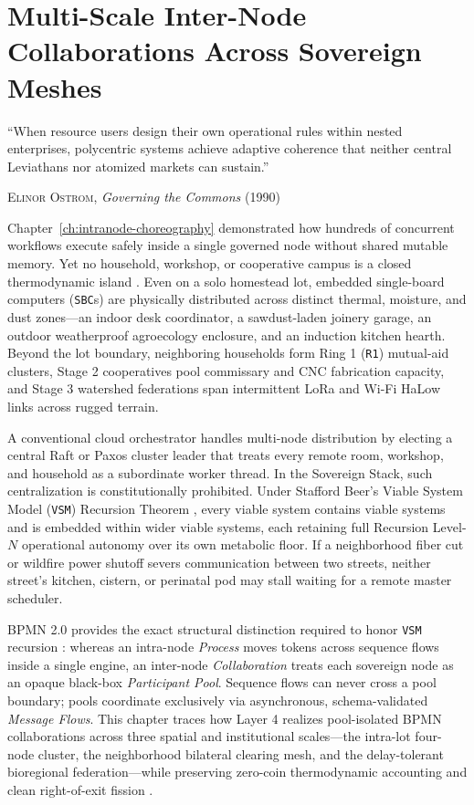\chapter{Multi-Scale Inter-Node Collaborations Across Sovereign Meshes}
\label{ch:internode-mesh}

\epigraph{``When resource users design their own operational rules within nested enterprises, polycentric systems achieve adaptive coherence that neither central Leviathans nor atomized markets can sustain.''}{\textsc{Elinor Ostrom}, \textit{Governing the Commons} (1990)}

Chapter~\ref{ch:intranode-choreography} demonstrated how hundreds of concurrent workflows
execute safely inside a single governed node without shared mutable memory. Yet no household,
workshop, or cooperative campus is a closed thermodynamic island \parencite{odum1971}. Even on
a solo homestead lot, embedded single-board computers (\texttt{SBC}s) are physically
distributed across distinct thermal, moisture, and dust zones---an indoor desk coordinator, a
sawdust-laden joinery garage, an outdoor weatherproof agroecology enclosure, and an induction
kitchen hearth. Beyond the lot boundary, neighboring households form Ring 1 (\texttt{R1})
mutual-aid clusters, Stage 2 cooperatives pool commissary and CNC fabrication capacity, and
Stage 3 watershed federations span intermittent LoRa and Wi-Fi HaLow links across rugged
terrain.

A conventional cloud orchestrator handles multi-node distribution by electing a central Raft
or Paxos cluster leader that treats every remote room, workshop, and household as a
subordinate worker thread. In the Sovereign Stack, such centralization is constitutionally
prohibited. Under Stafford Beer's Viable System Model (\texttt{VSM}) Recursion Theorem
\parencite{beer1972,beer1979}, every viable system contains viable systems and is embedded
within wider viable systems, each retaining full Recursion Level-$N$ operational autonomy over
its own metabolic floor. If a neighborhood fiber cut or wildfire power shutoff severs
communication between two streets, neither street's kitchen, cistern, or perinatal pod may
stall waiting for a remote master scheduler.

BPMN 2.0 provides the exact structural distinction required to honor \texttt{VSM} recursion
\parencite{omg2011bpmn,chinosi2012bpmn}: whereas an intra-node \emph{Process} moves tokens
across sequence flows inside a single engine, an inter-node \emph{Collaboration} treats each
sovereign node as an opaque black-box \emph{Participant Pool}. Sequence flows can never cross
a pool boundary; pools coordinate exclusively via asynchronous, schema-validated \emph{Message
Flows}. This chapter traces how Layer 4 realizes pool-isolated BPMN collaborations across
three spatial and institutional scales---the intra-lot four-node cluster, the neighborhood
bilateral clearing mesh, and the delay-tolerant bioregional federation---while preserving
zero-coin thermodynamic accounting and clean right-of-exit fission \parencite{hirschman1970}.

